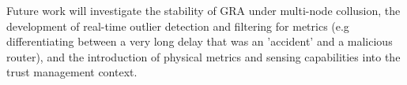 \documentclass[conference]{IEEEtran}
\begin{document}
Future work will investigate the stability of GRA under multi-node collusion, the development of real-time outlier detection and filtering for metrics (e.g differentiating between a very long delay that was an 'accident' and a malicious router), and the introduction of physical metrics and sensing capabilities into the trust management context.


%
%



%
%
\end{document}

